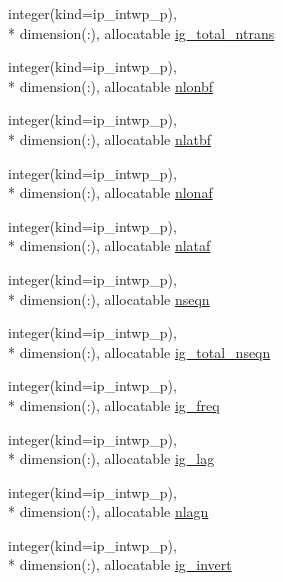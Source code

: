 \begin{DoxyCompactItemize}
\item 
integer(kind=ip\+\_\+intwp\+\_\+p), \\*
dimension(\+:), allocatable \hyperlink{classmod__oasis__namcouple_abbd7bd184bb2a3860063dbb9f109f427}{ig\+\_\+total\+\_\+ntrans}
\item 
integer(kind=ip\+\_\+intwp\+\_\+p), \\*
dimension(\+:), allocatable \hyperlink{classmod__oasis__namcouple_a6e774d31f16b513b1d604e72a82dff40}{nlonbf}
\item 
integer(kind=ip\+\_\+intwp\+\_\+p), \\*
dimension(\+:), allocatable \hyperlink{classmod__oasis__namcouple_a9b09ac96dad78313003a9436fe2f9aec}{nlatbf}
\item 
integer(kind=ip\+\_\+intwp\+\_\+p), \\*
dimension(\+:), allocatable \hyperlink{classmod__oasis__namcouple_ae413f2dc402b7c018e341081b8d6e208}{nlonaf}
\item 
integer(kind=ip\+\_\+intwp\+\_\+p), \\*
dimension(\+:), allocatable \hyperlink{classmod__oasis__namcouple_a80d81b2f026a2d0dc2de27b9ee04f7af}{nlataf}
\item 
integer(kind=ip\+\_\+intwp\+\_\+p), \\*
dimension(\+:), allocatable \hyperlink{classmod__oasis__namcouple_a20e9486f3e8bbdcee0de935e9be3a2e8}{nseqn}
\item 
integer(kind=ip\+\_\+intwp\+\_\+p), \\*
dimension(\+:), allocatable \hyperlink{classmod__oasis__namcouple_a09ed8be682296ef584f0d5777b2c6482}{ig\+\_\+total\+\_\+nseqn}
\item 
integer(kind=ip\+\_\+intwp\+\_\+p), \\*
dimension(\+:), allocatable \hyperlink{classmod__oasis__namcouple_affa727bb033c0f4d09962f2b4d1b4ab5}{ig\+\_\+freq}
\item 
integer(kind=ip\+\_\+intwp\+\_\+p), \\*
dimension(\+:), allocatable \hyperlink{classmod__oasis__namcouple_ae2c74692147a54b3f7534301d509f766}{ig\+\_\+lag}
\item 
integer(kind=ip\+\_\+intwp\+\_\+p), \\*
dimension(\+:), allocatable \hyperlink{classmod__oasis__namcouple_aad06af35c92de78d71671d39bcbb1690}{nlagn}
\item 
integer(kind=ip\+\_\+intwp\+\_\+p), \\*
dimension(\+:), allocatable \hyperlink{classmod__oasis__namcouple_a0b8948452bbd8cf1dc9f0fccc17c344d}{ig\+\_\+invert}

\end{DoxyCompactItemize}
